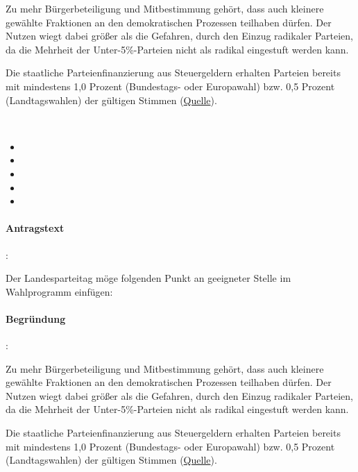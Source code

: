 Zu mehr Bürgerbeteiligung und Mitbestimmung gehört, dass auch kleinere gewählte Fraktionen an den demokratischen Prozessen teilhaben dürfen. Der Nutzen wiegt dabei größer als die Gefahren, durch den Einzug radikaler Parteien, da die Mehrheit der Unter-5\%-Parteien nicht als radikal eingestuft werden kann.

Die staatliche Parteienfinanzierung aus Steuergeldern erhalten Parteien bereits mit {\Gu}mindestens 1,0 Prozent (Bundestags- oder Europawahl) bzw. 0,5 Prozent (Landtagswahlen) der gültigen Stimmen{\Go} (\href{http://www.bpb.de/themen/513F3I,0,Staatliche_Parteienfinanzierung.html}{Quelle}). 


\label{wpa:prozenthuerde3}
\\
\begin{itemize}
\item {}
\item {}
\item {}
\item {}
\item {}
\end{itemize}

\paragraph{Antragstext}:

Der Landesparteitag möge folgenden Punkt an geeigneter Stelle im Wahlprogramm einfügen:


\paragraph{Begründung}:

Zu mehr Bürgerbeteiligung und Mitbestimmung gehört, dass auch kleinere gewählte Fraktionen an den demokratischen Prozessen teilhaben dürfen. Der Nutzen wiegt dabei größer als die Gefahren, durch den Einzug radikaler Parteien, da die Mehrheit der Unter-5\%-Parteien nicht als radikal eingestuft werden kann.

Die staatliche Parteienfinanzierung aus Steuergeldern erhalten Parteien bereits mit {\Gu}mindestens 1,0 Prozent (Bundestags- oder Europawahl) bzw. 0,5 Prozent (Landtagswahlen) der gültigen Stimmen{\Go} (\href{http://www.bpb.de/themen/513F3I,0,Staatliche_Parteienfinanzierung.html}{Quelle}). 

